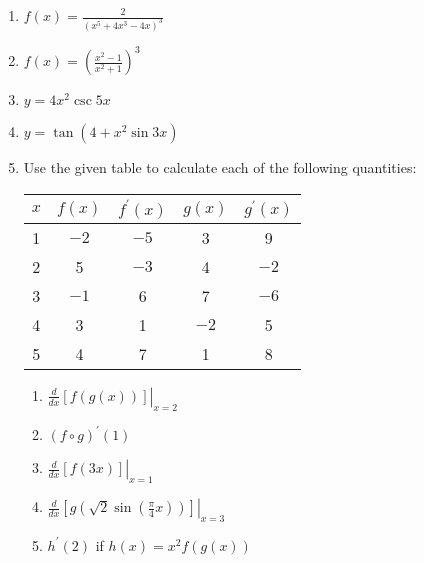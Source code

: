 \documentclass[12pt]{article}
\newif\ifans
\begin{document}
\begin{enumerate}
\item $f(x) = \frac{2}{(x^5+4x^3-4x)^3}$ 

\ifans{\fbox{$\frac{-6(5x^4+12x^2-4)}{(x^5+4x^3-4x)^4}$}} \fi

\item $f(x) = \left(\frac{x^2-1}{x^2+1}\right)^3$ 

\ifans{\fbox{$\frac{12x(x^2-1)^2}{(x^2+1)^4}$}} \fi

\item $y=4x^2\csc{5x}$

\ifans{\fbox{$8x\csc{(5x)}-20x^2\csc{(5x)}\cot{(5x)}$}} \fi

\item $y=\tan{(4+x^2\sin{3x})}$

\ifans{\fbox{$\left(3x^2\cos{3x}+2x\sin{3x}\right)\sec^2{\left(4+x^2\sin{3x}\right)}$}} \fi

\newpage

\item Use the given table to calculate each of the following quantities:

\begin{center}
\begin{tabular}{c|c|c|c|c}
$x$ & $f(x)$ & $f^{\prime}(x)$ & $g(x)$ & $g^{\prime}(x)$\\
\hline
1 & $-2$ & $-5$ & 3 & 9\\
2& 5 & $-3$ & 4 & $-2$\\
3 & $-1$ & 6  & 7 & $-6$\\
4 & 3 & 1 & $-2$ & 5\\
5 & 4 & 7 & 1 & 8
\end{tabular}
\end{center}

\begin{enumerate}

\item $\left.\frac{d}{dx}[f(g(x))]\right|_{x=2}$

\ifans{\fbox{$-2$}} \fi

\item $(f \circ g)^{\prime}(1)$

\ifans{\fbox{$54$}} \fi

\item $\left.\frac{d}{dx}[f(3x)]\right|_{x=1}$

\ifans{\fbox{$18$}} \fi

\item $\left.\frac{d}{dx}\left[g\left(\sqrt{2}\sin{\left(\frac{\pi}{4}x\right)}\right)\right]\right|_{x=3}$

\ifans{\fbox{$-\frac{9\pi}{4}$}} \fi

\item $h^{\prime}(2)$ if $h(x)=x^2f(g(x))$

\ifans{\fbox{$4$}} \fi

\end{enumerate}

\end{enumerate}
\end{document}
